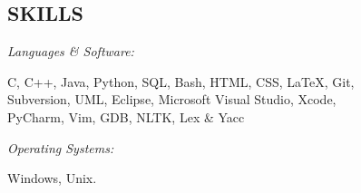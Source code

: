 \documentclass[line, margin]{res}
\begin{document}
\begin{resume}
\section{SKILLS}
    {\sl Languages \& Software:} \begin{minipage}[t]{\textwidth}
    C, C++, Java, Python, SQL, Bash, HTML, CSS, \LaTeX, Git,\\
    Subversion, UML, Eclipse, Microsoft Visual Studio, Xcode, \\
    PyCharm, Vim, GDB, NLTK, Lex \& Yacc
    \end{minipage}
    {\sl Operating Systems:} \begin{minipage}[t]{\textwidth}
    Windows, Unix.
    \end{minipage}


\end{resume}
\end{document}
